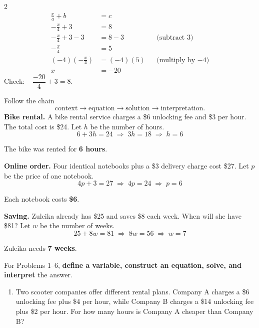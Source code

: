 \begin{multicols}{2}
		\begin{align*}
			\frac{x}{a}+b&=c \\
			-\frac{x}{4}+3&=8 \\
			-\frac{x}{4}+3-3&=8-3 &&\text{(subtract 3)}\\
			-\frac{x}{4}&=5\\
			(-4)\left(-\frac{x}{4}\right)&=(-4)(5) &&\text{(multiply by $-4$)}\\
			x&=-20
		\end{align*}
		\vspace{-4mm}
		Check: $-\dfrac{-20}{4}+3=8$.
		
		\newpage
		
		Follow the chain
		\[
		\text{context}\longrightarrow\text{equation}\longrightarrow
		\text{solution}\longrightarrow\text{interpretation}.
		\]
		\textbf{Bike rental.} A bike rental service charges a \$6 unlocking fee and
		\$3 per hour. The total cost is \$24. Let $h$ be the number of hours.\vspace{-2mm}
		\[
		6+3h=24\;\Longrightarrow\;3h=18\;\Longrightarrow\;h=6
		\]
		
		\vspace{-2mm}
		The bike was rented for \textbf{6 hours}.
		
		\textbf{Online order.} Four identical notebooks plus a \$3 delivery charge cost
		\$27. Let $p$ be the price of one notebook.\vspace{-2mm}
		\[
		4p+3=27\;\Longrightarrow\;4p=24\;\Longrightarrow\;p=6
		\]
		
		\vspace{-2mm}
		Each notebook costs \textbf{\$6}.
		
		\textbf{Saving.} Zuleika already has \$25 and saves \$8 each week. When will she
		have \$81? Let $w$ be the number of weeks.\vspace{-2mm}
		\[
		25+8w=81\;\Longrightarrow\;8w=56\;\Longrightarrow\;w=7
		\]
		
		\vspace{-2mm}
		Zuleika needs \textbf{7 weeks}.
		
		
		
		For Problems 1--6, \textbf{define a variable, construct an equation, solve,
			and interpret} the answer.
		

		\begin{enumerate}[label=\textbf{\arabic*.}]
			\item Two scooter companies offer different rental plans. Company A charges
			a \$6 unlocking fee plus \$4 per hour, while Company B charges a \$14
			unlocking fee plus \$2 per hour. For how many hours is Company A cheaper
			than Company B?
			

\end{enumerate}
\end{multicols}
